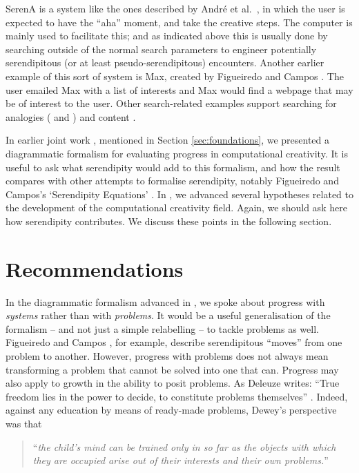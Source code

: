 \documentclass{llncs}
\begin{document}
SerenA is a system like the ones described by Andr{\'e} et
al.~\cite{andre2009discovery}, in which the user is expected to have
the ``aha'' moment, and take the creative steps.  The computer is
mainly used to facilitate this; and as indicated above this is usually
done by searching outside of the normal search parameters to engineer
potentially serendipitous (or at least pseudo-serendipitous)
encounters.  Another earlier example of this sort of system is {\sf
  Max}, created by Figueiredo and Campos \cite{Campos2002}.  The user
emailed {\sf Max} with a list of interests and {\sf Max} would find a
webpage that may be of interest to the user.  Other search-related
examples support searching for analogies (\cite{Donoghue2002} and
\cite{Donoghue2012}) and content \cite{Iaquinta2008}.

In earlier joint work \cite{colton-assessingprogress}, mentioned in
Section \ref{sec:foundations}, we presented a diagrammatic formalism
for evaluating progress in computational creativity.  It is useful to
ask what serendipity would add to this formalism, and how the result
compares with other attempts to formalise serendipity, notably
Figueiredo and Campos's `Serendipity Equations' \cite{Figueiredo2001}.
%
In \cite{stakeholder-groups-bookchapter}, we advanced several
hypotheses related to the development of the computational creativity
field.  Again, we should ask here how serendipity contributes.  We
discuss these points in the following section.

\section{Recommendations} \label{sec:recommendations}

In the diagrammatic formalism advanced in
\cite{colton-assessingprogress}, we spoke about progress with
\emph{systems} rather than with \emph{problems}.  It would be a useful
generalisation of the formalism -- and not just a simple relabelling
-- to tackle problems as well.
%
Figueiredo and Campos \cite{Figueiredo2001}, for example, describe
serendipitous ``moves'' from one problem to another.
%
However, progress with problems does not always mean transforming a
problem that cannot be solved into one that can.  Progress may also
apply to growth in the ability to posit problems.  As Deleuze writes:
``True freedom lies in the power to decide, to constitute problems
themselves'' \cite[p. 15]{deleuze1991bergsonism}.  Indeed, against any
education by means of ready-made problems, Dewey's perspective was
that
\begin{quote}
``\emph{the child's mind can be trained only in so far as the objects
    with which they are occupied arise out of their interests and
    their own problems.}''~\cite{dewey-by-mead}
\end{quote}
\end{document}
